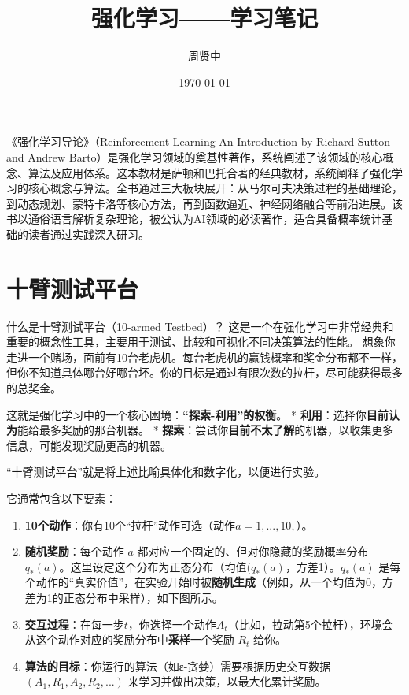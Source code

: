 \documentclass[11pt]{ctexart}
\author{周贤中}
\date{\today}
\title{强化学习------学习笔记}
\providecommand{\tightlist}{%
      \setlength{\itemsep}{0pt}\setlength{\parskip}{0pt}}
\begin{document}
    
    \maketitle
    
    

    

《强化学习导论》（Reinforcement Learning An Introduction by Richard
Sutton and Andrew
Barto）是强化学习领域的奠基性著作，系统阐述了该领域的核心概念、算法及应用体系。这本教材是萨顿和巴托合著的经典教材，系统阐释了强化学习的核心概念与算法。全书通过三大板块展开：从马尔可夫决策过程的基础理论，到动态规划、蒙特卡洛等核心方法，再到函数逼近、神经网络融合等前沿进展。该书以通俗语言解析复杂理论，被公认为AI领域的必读著作，适合具备概率统计基础的读者通过实践深入研习。

    \hypertarget{ux5341ux81c2ux6d4bux8bd5ux5e73ux53f0}{%
\section{十臂测试平台}\label{ux5341ux81c2ux6d4bux8bd5ux5e73ux53f0}}

什么是十臂测试平台（10-armed Testbed）？
这是一个在强化学习中非常经典和重要的概念性工具，主要用于测试、比较和可视化不同决策算法的性能。
想象你走进一个赌场，面前有10台老虎机。每台老虎机的赢钱概率和奖金分布都不一样，但你不知道具体哪台好哪台坏。你的目标是通过有限次数的拉杆，尽可能获得最多的总奖金。

这就是强化学习中的一个核心困境：\textbf{``探索-利用''的权衡}。 *
\textbf{利用}：选择你\textbf{目前认为}能给最多奖励的那台机器。 *
\textbf{探索}：尝试你\textbf{目前不太了解}的机器，以收集更多信息，可能发现奖励更高的机器。

``十臂测试平台''就是将上述比喻具体化和数字化，以便进行实验。

它通常包含以下要素：

\begin{enumerate}
\def\labelenumi{\arabic{enumi}.}
\tightlist
\item
  \textbf{10个动作}：你有10个``拉杆''动作可选（动作\(a=1,...,10,\)）。
\item
  \textbf{随机奖励}：每个动作 \(a\)
  都对应一个固定的、但对你隐藏的奖励概率分布\(q_*(a)\)。这里设定这个分布为正态分布（均值\((q_*(a)\)，方差1）。\(q_*(a)\)
  是每个动作的``真实价值''，在实验开始时被\textbf{随机生成}（例如，从一个均值为0，方差为1的正态分布中采样），如下图所示。
\item
  \textbf{交互过程}：在每一步\(t\)，你选择一个动作\(A_t\)（比如，拉动第5个拉杆），环境会从这个动作对应的奖励分布中\textbf{采样}一个奖励
  \(R_t\) 给你。
\item
  \textbf{算法的目标}：你运行的算法（如ε-贪婪）需要根据历史交互数据
  \((A_1, R_1, A_2, R_2, ...)\) 来学习并做出决策，以最大化累计奖励。
\end{enumerate}
\end{document}
